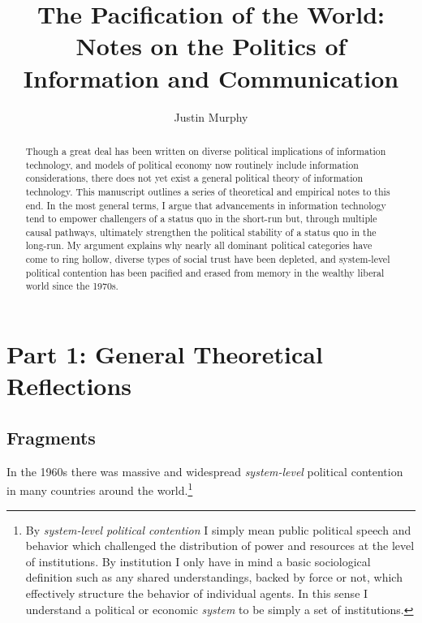 \documentclass[12pt,book]{article}
\title{The Pacification of the World: Notes on the Politics of Information and
Communication}
\author{Justin Murphy}
\date{}
\begin{document}
\maketitle


\begin{abstract} 
Though a great deal has been written on diverse political implications of information technology, and models of political economy now routinely include information considerations, there does not yet exist a general political theory of information technology. This manuscript outlines a series of theoretical and empirical notes to this end. In the most general terms, I argue that advancements in information technology tend to empower challengers of a status quo in the short-run but, through multiple causal pathways, ultimately strengthen the political stability of a status quo in the long-run. My argument explains why nearly all dominant political categories have come to ring hollow, diverse types of social trust have been depleted, and system-level political contention has been pacified and erased from memory in the wealthy liberal world since the 1970s.
\end{abstract}

{
\hypersetup{linkcolor=black}
\setcounter{tocdepth}{2}
\tableofcontents
}
\section{Part 1: General Theoretical
Reflections}\label{part-1-general-theoretical-reflections}

\subsection{Fragments}\label{fragments}

In the 1960s there was massive and widespread \emph{system-level}
political contention in many countries around the world.\footnote{By
  \emph{system-level political contention} I simply mean public
  political speech and behavior which challenged the distribution of
  power and resources at the level of institutions. By institution I
  only have in mind a basic sociological definition such as any shared
  understandings, backed by force or not, which effectively structure
  the behavior of individual agents. In this sense I understand a
  political or economic \emph{system} to be simply a set of
  institutions.}
\end{document}
